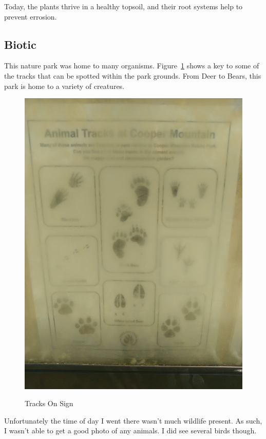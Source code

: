 \documentclass{article}
\begin{document}
Today, the plants thrive in a healthy topsoil, and their root systems help to prevent 
errosion. 

\newpage

\subsection{Biotic}\label{ssub:biotic}
This nature park was home to many organisms. Figure~\ref{tracks} shows a key to some of 
the tracks that can be spotted within the park grounds. From Deer to Bears, this park
is home to a variety of creatures.

\begin{figure}[H]
\centering{}
\caption{Tracks On Sign}
\includegraphics[scale=0.07]{animal_tracks.jpg}
\label{tracks}
\end{figure}
\newpage
Unfortunately the time of day I went there wasn't much wildlife present. As such, 
I wasn't able to get a good photo of any animals. I did see several birds though.
\end{document}
